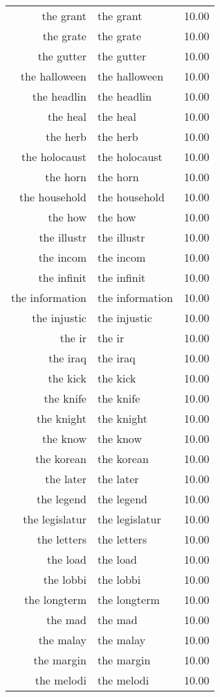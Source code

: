 \begin{table}[ht]
\begin{tabular}{rlr}
  the grant & the grant & 10.00 \\ 
  the grate & the grate & 10.00 \\ 
  the gutter & the gutter & 10.00 \\ 
  the halloween & the halloween & 10.00 \\ 
  the headlin & the headlin & 10.00 \\ 
  the heal & the heal & 10.00 \\ 
  the herb & the herb & 10.00 \\ 
  the holocaust & the holocaust & 10.00 \\ 
  the horn & the horn & 10.00 \\ 
  the household & the household & 10.00 \\ 
  the how & the how & 10.00 \\ 
  the illustr & the illustr & 10.00 \\ 
  the incom & the incom & 10.00 \\ 
  the infinit & the infinit & 10.00 \\ 
  the information & the information & 10.00 \\ 
  the injustic & the injustic & 10.00 \\ 
  the ir & the ir & 10.00 \\ 
  the iraq & the iraq & 10.00 \\ 
  the kick & the kick & 10.00 \\ 
  the knife & the knife & 10.00 \\ 
  the knight & the knight & 10.00 \\ 
  the know & the know & 10.00 \\ 
  the korean & the korean & 10.00 \\ 
  the later & the later & 10.00 \\ 
  the legend & the legend & 10.00 \\ 
  the legislatur & the legislatur & 10.00 \\ 
  the letters & the letters & 10.00 \\ 
  the load & the load & 10.00 \\ 
  the lobbi & the lobbi & 10.00 \\ 
  the longterm & the longterm & 10.00 \\ 
  the mad & the mad & 10.00 \\ 
  the malay & the malay & 10.00 \\ 
  the margin & the margin & 10.00 \\ 
  the melodi & the melodi & 10.00 \\ 

\end{tabular}
\end{table}
